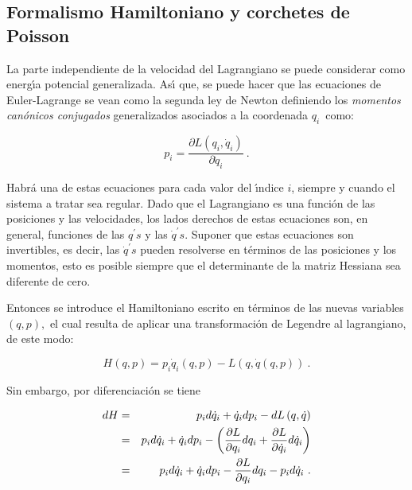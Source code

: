 \subsection{Formalismo Hamiltoniano y corchetes de Poisson}

La parte independiente de la velocidad del Lagrangiano se puede considerar
como energ\'{\i}a potencial generalizada. As\'{\i} que, se puede hacer que
las ecuaciones de Euler-Lagrange se vean como la segunda ley de Newton
definiendo los \emph{momentos can\'{o}nicos conjugados} generalizados
asociados a la coordenada $q_{i}$\ como:

\begin{equation}
p_{i}=\frac{\partial L(q_{i},\dot{q}_{i})}{\partial \dot{q}_{i}}~.
\label{2.9}
\end{equation}

Habr\'{a} una de estas ecuaciones para cada valor del \'{\i}ndice $i$,
siempre y cuando el sistema a tratar sea regular. Dado que el Lagrangiano es
una funci\'{o}n de las posiciones y las velocidades, los lados derechos de
estas ecuaciones son, en general, funciones de las $q^{\prime }s$ y las $%
\dot{q}^{\prime }s$. Suponer que estas ecuaciones son invertibles, es decir,
las $\dot{q}^{\prime }s$ pueden resolverse en t\'{e}rminos de las posiciones
y los momentos, esto es posible siempre que el determinante de la matriz
Hessiana sea diferente de cero.

Entonces se introduce el Hamiltoniano escrito en t\'{e}rminos de las nuevas
variables $(q,p),$ el cual resulta de aplicar una transformaci\'{o}n de
Legendre al lagrangiano, de este modo:\bigskip 

\begin{equation}
H\left( q,p\right) =p_{i}\dot{q}_{i}\left( q,p\right) -L\left( q,\dot{q}%
\left( q,p\right) \right) ~.  \label{2.10}
\end{equation}

Sin embargo, por diferenciaci\'{o}n se tiene

\begin{eqnarray}
dH &=&p_{i}d\dot{q}_{i}+\dot{q}_{i}dp_{i}-dL\left( q,\dot{q}\right) 
\label{2.11} \\
&=&p_{i}d\dot{q}_{i}+\dot{q}_{i}dp_{i}-\left( \frac{\partial L}{\partial
q_{i}}dq_{i}+\frac{\partial L}{\partial \dot{q}_{i}}d\dot{q}_{i}\right)  
\notag \\
&=&p_{i}d\dot{q}_{i}+\dot{q}_{i}dp_{i}-\frac{\partial L}{\partial q_{i}}%
dq_{i}-p_{i}d\dot{q}_{i}~.  \label{2.11a}
\end{eqnarray}

